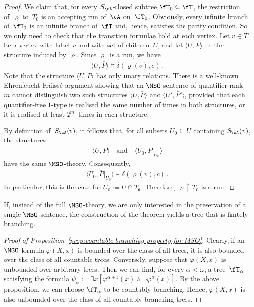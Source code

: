 \documentclass{LMCS}
\begin{document}
\begin{proof}
We claim that, for every $S_\cA$-closed subtree $\fT_0 \subseteq \fT$,
the restriction of~$\varrho$ to~$T_0$ is an accepting run of~$\cA$ on~$\fT_0$.
Obviously, every infinite branch of~$\fT_0$ is an infinite branch of~$\fT$
and, hence, satisfies the parity condition. So we only need to check
that the transition formulae hold at each vertex.
Let $v \in T$ be a vertex with label~$c$ and with set of children~$U$, and
let $\langle U,\bar P\rangle$ be the structure induced by~$\varrho$.
Since $\varrho$~is a run, we have
\begin{align*}
  \langle U,\bar P\rangle \models \delta(\varrho(v),c)\,.
\end{align*}
Note that the structure $\langle U,\bar P\rangle$ has only unary relations.
There is a well-known Ehrenfeucht-Fra\"\i ss\'e argument showing that
an $\MSO$-sentence of quantifier rank~$m$ cannot distinguish
two such structures $\langle U,\bar P\rangle$ and $\langle U',\bar P'\rangle$,
provided that each quantifier-free $1$-type is realised the same
number of times in both structures, or it is realised at least $2^m$~times
in each structure.

By definition of~$S_\cA(v)$, it follows that,
for all subsets $U_0 \subseteq U$ containing $S_\cA(v)$,
the structures
\begin{align*}
  \langle U,\bar P\rangle
  \quad\text{and}\quad
  \langle U_0,\bar P|_{U_0}\rangle
\end{align*}
have the same $\MSO$-theory.
Consequently,
\begin{align*}
  \langle U_0,\bar P|_{U_0}\rangle \models \delta(\varrho(v),c)\,.
\end{align*}
In particular, this is the case for $U_0 := U \cap T_0$.
Therefore, $\varrho \restriction T_0$ is a run.
\end{proof}
\begin{rem}
If, instead of the full $\MSO$-theory, we are only interested in
the preservation of a single $\MSO$-sentence,
the construction of the theorem yields a tree that is finitely branching.
\end{rem}

\begin{proof}[Proof of Proposition~\ref{prop:countable branching property for MSO}]
Clearly, if an $\MSO$-formula $\varphi(X,x)$ is bounded over the class of all
trees, it is also bounded over the class of all countable trees.
Conversely, suppose that $\varphi(X,x)$ is unbounded over arbitrary
trees. Then we can find, for every $\alpha < \omega$, a tree~$\fT_\alpha$
satisfying the formula
$\psi_\alpha := \exists x[\varphi^{\alpha+1}(x) \land \neg\varphi^\alpha(x)]$.
By the above proposition, we can choose $\fT_\alpha$ to be countably branching.
Hence, $\varphi(X,x)$ is also unbounded over the class of all countably
branching trees.
\end{proof}
\end{document}
